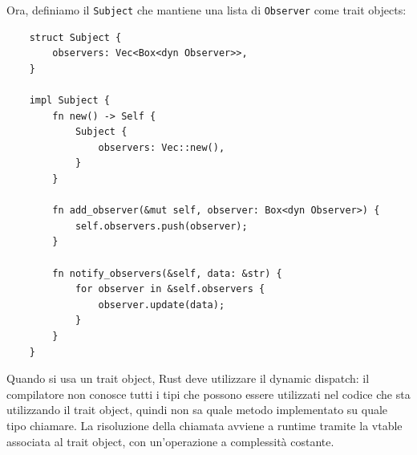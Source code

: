 Ora, definiamo il \texttt{Subject} che mantiene una lista di \texttt{Observer} come trait objects:
\begin{verbatim}
    struct Subject {
        observers: Vec<Box<dyn Observer>>,
    }

    impl Subject {
        fn new() -> Self {
            Subject {
                observers: Vec::new(),
            }
        }

        fn add_observer(&mut self, observer: Box<dyn Observer>) {
            self.observers.push(observer);
        }

        fn notify_observers(&self, data: &str) {
            for observer in &self.observers {
                observer.update(data);
            }
        }
    }
\end{verbatim}
Quando si usa un trait object, Rust deve utilizzare il dynamic dispatch: il compilatore non conosce tutti i tipi che possono essere utilizzati nel codice che sta utilizzando il trait object, quindi non sa quale metodo implementato su quale tipo chiamare. La risoluzione della chiamata avviene a runtime tramite la vtable associata al trait object, con un’operazione a complessità costante.
